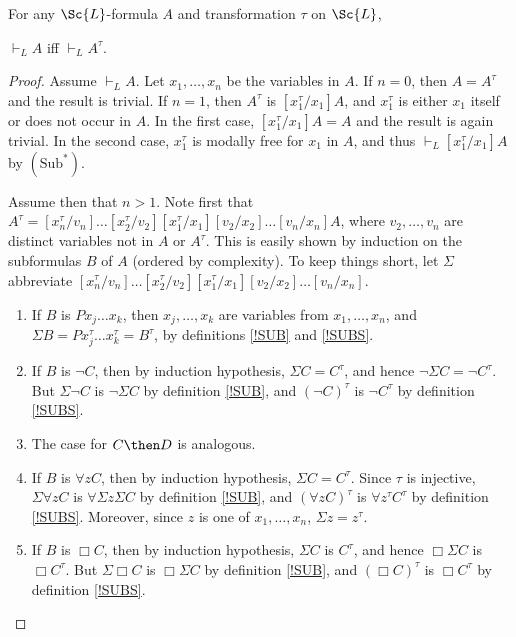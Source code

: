 \documentclass[11pt]{woarticle}
\newcommand{\cmnt}[1]{\iffalse #1 \fi}
\theoremstyle{break}
\theoremstyle{nonumberplain}
\newcommand{\1}{\;\,|\;\,}
\newcommand{\T}[1]{\ensuremath{(\mathrm{ #1})}}
\newcommand{\itemT}[1]{\item[\T{#1}]}
\begin{document}
\begin{lemma}\label{subtrans}
  For any $\Sc{L}$-formula $A$ and transformation $\tau$ on $\Sc{L}$,
  \begin{semantics}
    \itemT{Sub^\tau} $\vdash_L A$ iff $\vdash_L A^\tau$.
  \end{semantics}
\end{lemma}

\begin{proof}
  Assume $\vdash_{L} A$. Let $x_1,\ldots,x_n$ be the variables in
  $A$. If $n=0$, then $A = A^\tau$ and the result is trivial. If
  $n=1$, then $A^\tau$ is $[x_1^\tau/x_1]A$, and $x_1^\tau$ is either
  $x_1$ itself or does not occur in $A$. In the first case,
  $[x_1^\tau/x_1]A = A$ and the result is again trivial. In the second
  case, $x_1^\tau$ is modally free for $x_1$ in $A$, and thus
  $\vdash_L [x_1^\tau/x_1]A$ by \T{Sub^*}.

  Assume then that $n > 1$. Note first that $A^\tau =
  [x_{n}^\tau/v_{n}]\ldots[x_2^\tau/v_2][x_1^\tau/x_1][v_2/x_2]\ldots[v_n/x_n]A$,
  where $v_2,\ldots,v_n$ are distinct variables not in $A$ or
  $A^\tau$. This is easily shown by induction on the subformulas $B$
  of $A$ (ordered by complexity). To keep things short, let $\Sigma$
  abbreviate
  $[x_{n}^\tau/v_{n}]\ldots[x_2^\tau/v_2][x_1^\tau/x_1][v_2/x_2]\ldots[v_n/x_n]$.
  \begin{enumerate}
  \item If $B$ is $Px_j\ldots x_k$, then $x_j,\ldots, x_k$ are
    variables from $x_1,\ldots,x_n$, and $\Sigma B = Px_j^\tau\ldots
    x_k^\tau = B^\tau$, by definitions \ref{!SUB} and \ref{!SUBS}. 
  \item If $B$ is $\neg C$, then by induction hypothesis, $\Sigma C =
    C^\tau$, and hence $\neg \Sigma C = \neg C^\tau$. But
    $\Sigma \neg C$ is $\neg \Sigma C$ by definition \ref{!SUB}, and
    $(\neg C)^\tau$ is $\neg C^\tau$ by definition \ref{!SUBS}.
  \item The case for $C \then D$ is analogous.
  \item If $B$ is $\forall z C$, then by induction hypothesis, $\Sigma
    C = C^\tau$. Since $\tau$ is injective, $\Sigma \forall z C$ is
    $\forall \Sigma z \Sigma C$ by definition \ref{!SUB}, and
    $(\forall z C)^\tau$ is $\forall z^\tau C^\tau$ by definition
    \ref{!SUBS}. Moreover, since $z$ is one of $x_1,\ldots,x_n$,
    $\Sigma z = z^\tau$.%
    \cmnt{%
      (Here things would get a lot more complicated if we had defined
      substitution differently, so that $[y/x]\forall x Fx \not=
      \forall y Fy$.)%
    } %
  \item If $B$ is $\Box C$, then by induction hypothesis, $\Sigma C$
    is $C^\tau$, and hence $\Box \Sigma C$ is $\Box C^\tau$. But
    $\Sigma \Box C$ is $\Box \Sigma C$ by definition \ref{!SUB}, and
    $(\Box C)^\tau$ is $\Box C^\tau$ by definition \ref{!SUBS}.
  \end{enumerate}


\end{proof}
\end{document}
